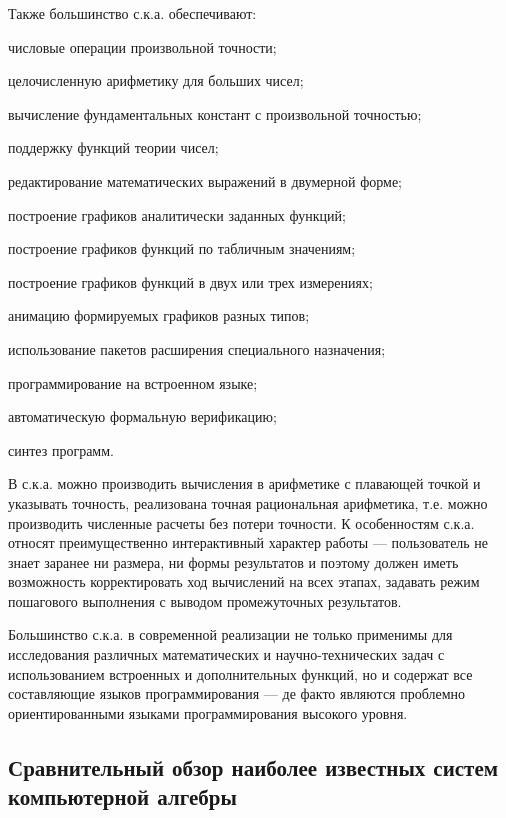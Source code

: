 Также большинство с.к.а. обеспечивают:
\begin{textitemize}
	\item числовые операции произвольной точности; 
	\item целочисленную арифметику для больших чисел;
	\item вычисление фундаментальных констант с произвольной точностью;
	\item поддержку функций теории чисел;
	\item редактирование математических выражений в двумерной форме; 
	\item построение графиков аналитически заданных функций; 
	\item построение графиков функций по табличным значениям; 
	\item построение графиков функций в двух или трех измерениях;
	\item анимацию формируемых графиков разных типов;
	\item использование пакетов расширения специального назначения;
	\item программирование на встроенном языке;
	\item автоматическую формальную верификацию;
	\item синтез программ.
\end{textitemize}

В с.к.а. можно производить вычисления в арифметике с плавающей точкой и указывать точность, реализована точная рациональная арифметика, т.е. можно производить численные расчеты без потери точности. К особенностям с.к.а. относят преимущественно интерактивный характер работы --- пользователь не знает заранее ни размера, ни формы результатов и поэтому должен иметь возможность корректировать ход вычислений на всех этапах, задавать режим пошагового выполнения с выводом промежуточных результатов.

Большинство с.к.а. в современной реализации не только применимы для исследования различных математических и научно-технических задач с использованием встроенных и дополнительных функций, но и содержат все составляющие языков программирования --- де факто являются проблемно ориентированными языками программирования высокого уровня. 

\subsection{Сравнительный обзор наиболее известных систем компьютерной алгебры}
\label{subsec_cas_survey}

